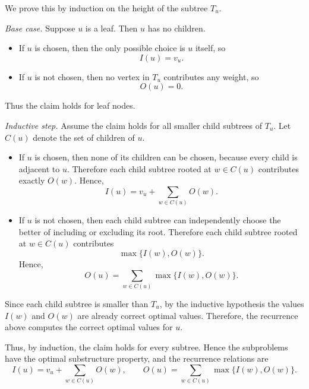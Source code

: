 \documentclass{article}
\begin{document}
We prove this by induction on the height of the subtree \(T_u\).

\medskip

\emph{Base case.} Suppose \(u\) is a leaf. Then \(u\) has no children.
\begin{itemize}
    \item If \(u\) is chosen, then the only possible choice is \(u\) itself, so
    \[
    I(u)=v_u.
    \]
    \item If \(u\) is not chosen, then no vertex in \(T_u\) contributes any weight, so
    \[
    O(u)=0.
    \]
\end{itemize}
Thus the claim holds for leaf nodes.

\medskip

\emph{Inductive step.} Assume the claim holds for all smaller child subtrees of \(T_u\). Let \(C(u)\) denote the set of children of \(u\).

\begin{itemize}
    \item If \(u\) is chosen, then none of its children can be chosen, because every child is adjacent to \(u\). Therefore each child subtree rooted at \(w\in C(u)\) contributes exactly \(O(w)\). Hence,
    \[
    I(u)=v_u+\sum_{w\in C(u)} O(w).
    \]

    \item If \(u\) is not chosen, then each child subtree can independently choose the better of including or excluding its root. Therefore each child subtree rooted at \(w\in C(u)\) contributes
    \[
    \max\{I(w),O(w)\}.
    \]
    Hence,
    \[
    O(u)=\sum_{w\in C(u)} \max\{I(w),O(w)\}.
    \]
\end{itemize}

Since each child subtree is smaller than \(T_u\), by the inductive hypothesis the values \(I(w)\) and \(O(w)\) are already correct optimal values. Therefore, the recurrence above computes the correct optimal values for \(u\).

Thus, by induction, the claim holds for every subtree. Hence the subproblems have the optimal substructure property, and the recurrence relations are
\[
I(u)=v_u+\sum_{w\in C(u)} O(w),
\qquad
O(u)=\sum_{w\in C(u)} \max\{I(w),O(w)\}.
\]
\end{document}
